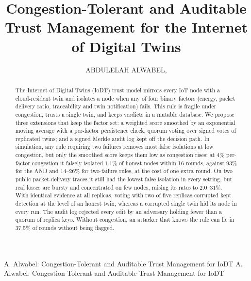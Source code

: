 \documentclass{ieeeaccess}
\begin{document}

\title{Congestion-Tolerant and Auditable Trust Management for the
Internet of Digital Twins}

\author{\uppercase{Abdulelah Alwabel}, 
}

\address[1]{Department of Computer Sciences,
    College of Computer Engineering and Sciences,
    Prince Sattam bin Abdulaziz University,
    Al-Kharj, Saudi Arabia}


\markboth
{A. Alwabel: Congestion-Tolerant and Auditable Trust Management for IoDT}
{A. Alwabel: Congestion-Tolerant and Auditable Trust Management for IoDT}


\begin{abstract}
The Internet of Digital Twins (IoDT) trust model mirrors every IoT node
with a cloud-resident twin and isolates a node when any of four binary
factors (energy, packet delivery ratio, traceability and twin
notification) fails.  This rule is fragile under congestion, trusts a
single twin, and keeps verdicts in a mutable database.  We propose
three extensions that keep the factor set: a weighted score smoothed by
an exponential moving average with a per-factor persistence check;
quorum voting over signed votes of replicated twins; and a signed
Merkle audit log kept off the decision path.  In simulation, any rule
requiring two failures removes most false isolations at low
congestion, but only the smoothed score keeps them low as congestion
rises: at $4\%$ per-factor congestion it falsely isolated $1.1\%$ of
honest nodes within 16 rounds, against $93\%$ for the AND and
$14$--$26\%$ for two-failure rules, at the cost of one extra round.
On two public packet-delivery traces it still had the lowest false
isolation in every setting, but real losses are bursty and
concentrated on few nodes, raising its rates to $2.0$--$31\%$.  With
identical evidence at all replicas, voting with two of five replicas
corrupted kept detection at the level of an honest twin,
whereas a corrupted single twin hid its node in every run.  The audit
log rejected every edit by an adversary holding fewer than a quorum of
replica keys.  Without congestion, an attacker that knows the rule can
lie in $37.5\%$ of rounds without being flagged.
\end{abstract}
\end{document}
